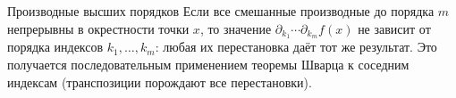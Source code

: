 \begin{Corollary}{Производные высших порядков}{}
	Если все смешанные производные до порядка $m$ непрерывны в окрестности точки $x$,
	то значение $\partial_{k_1}\cdots\partial_{k_m} f(x)$ не зависит от порядка
	индексов $k_1,\dots,k_m$: любая их перестановка даёт тот же результат. Это
	получается последовательным применением теоремы Шварца к соседним индексам
	(транспозиции порождают все перестановки).
\end{Corollary}
